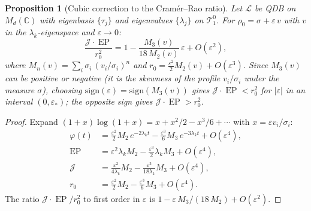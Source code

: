 \documentclass[11pt,a4paper]{article}
\newtheorem{proposition}[theorem]{Proposition}
\theoremstyle{definition}
\theoremstyle{remark}
\DeclareMathOperator{\EP}{EP}
\newcommand{\C}{\mathbb{C}}
\newcommand{\TT}{\mathcal{T}}
\newcommand{\LL}{\mathcal{L}}
\begin{document}
\begin{proposition}[Cubic correction to the Cram\'er--Rao
ratio]\label{prop:cubic}
Let $\LL$ be QDB on $M_d(\C)$ with eigenbasis $\{\tau_j\}$ and
eigenvalues $\{\lambda_j\}$ on $\TT_1^0$.  For
$\rho_0 = \sigma + \varepsilon\,v$ with $v$ in the $\lambda_k$-eigenspace
and $\varepsilon \to 0$:
\begin{equation}\label{eq:cubic}
  \frac{\mathcal{J}\cdot\EP}{r_0^2}
  = 1 - \frac{M_3(v)}{18\,M_2(v)}\,\varepsilon + O(\varepsilon^2),
\end{equation}
where $M_n(v) = \sum_i \sigma_i\,(v_i/\sigma_i)^n$ and $r_0 =
\frac{\varepsilon^2}{2}M_2(v) + O(\varepsilon^3)$.
Since $M_3(v)$ can be positive or negative
(it is the skewness of the profile $v_i/\sigma_i$ under the
measure $\sigma$), choosing
$\mathrm{sign}(\varepsilon) = \mathrm{sign}(M_3(v))$ gives
$\mathcal{J}\cdot\EP < r_0^2$ for $|\varepsilon|$ in an
interval $(0, \varepsilon_*)$; the opposite sign gives
$\mathcal{J}\cdot\EP > r_0^2$.
\end{proposition}

\begin{proof}
Expand $(1+x)\log(1+x) = x + x^2/2 - x^3/6 + \cdots$ with
$x = \varepsilon v_i/\sigma_i$:
\begin{align*}
  \varphi(t) &= \tfrac{\varepsilon^2}{2}M_2\,e^{-2\lambda_k t}
  - \tfrac{\varepsilon^3}{6}M_3\,e^{-3\lambda_k t} + O(\varepsilon^4), \\
  \EP &= \varepsilon^2\lambda_k M_2 - \tfrac{\varepsilon^3}{2}\lambda_k M_3
  + O(\varepsilon^4), \\
  \mathcal{J} &= \tfrac{\varepsilon^2}{4\lambda_k}M_2
  - \tfrac{\varepsilon^3}{18\lambda_k}M_3 + O(\varepsilon^4), \\
  r_0 &= \tfrac{\varepsilon^2}{2}M_2
  - \tfrac{\varepsilon^3}{6}M_3 + O(\varepsilon^4).
\end{align*}
The ratio $\mathcal{J}\cdot\EP/r_0^2$ to first order in $\varepsilon$
is $1 - \varepsilon\,M_3/(18\,M_2) + O(\varepsilon^2)$.
\end{proof}
\end{document}
